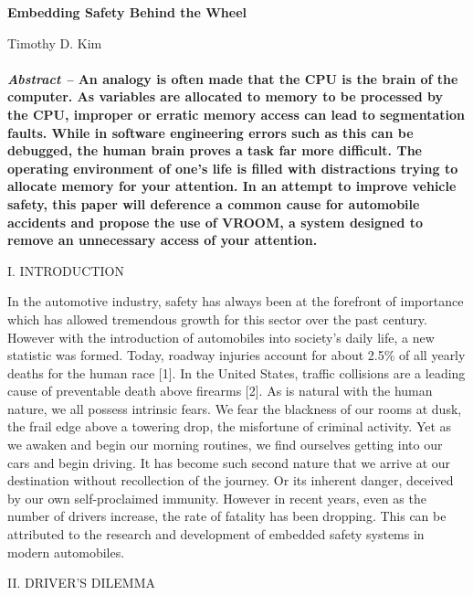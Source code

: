 \documentclass[11pt]{article}
\begin{document}
\begin{center}
	\textbf{{\LARGE Embedding Safety Behind the Wheel}}\\
\end{center}
\begin{center}
	\large{Timothy D. Kim}
\end{center}

\begin{multicols}{2}
\paragraph*{}
\textbf{\textit{Abstract --} An analogy is often made that the CPU is the brain of the computer. As variables are allocated to memory to be processed by the CPU, improper or erratic memory access can lead to segmentation faults. While in software engineering errors such as this can be debugged, the human brain proves a task far more difficult. The operating environment of one’s life is filled with distractions trying to allocate memory for your attention. In an attempt to improve vehicle safety, this paper will deference a common cause for automobile accidents and propose the use of VROOM, a system designed to remove an unnecessary access of your attention.}
\begin{center}
	I. INTRODUCTION
\end{center}
In the automotive industry, safety has always been at the forefront of importance which has allowed tremendous growth for this sector over the past century. However with the introduction of automobiles into society's daily life, a new statistic was formed. Today, roadway injuries account for about 2.5\% of all yearly deaths for the human race [1]. In the United States, traffic collisions are a leading cause of preventable death above firearms [2]. As is natural with the human nature, we all possess intrinsic fears. We fear the blackness of our rooms at dusk, the frail edge above a towering drop, the misfortune of criminal activity. Yet as we awaken and begin our morning routines, we find ourselves getting into our cars and begin driving. It has become such second nature that we arrive at our destination without recollection of the journey. Or its inherent danger, deceived by our own self-proclaimed immunity. However in recent years, even as the number of drivers increase, the rate of fatality has been dropping. This can be attributed to the research and development of embedded safety systems in modern automobiles.
\begin{center}
	II. DRIVER'S DILEMMA

\end{center}
\end{multicols}
\end{document}
